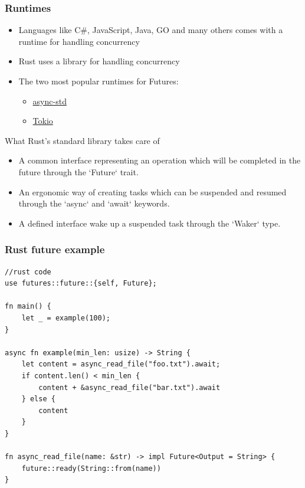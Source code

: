 \begin{frame}[fragile]
    \frametitle{Runtimes}
    \begin{itemize}
        \item Languages like C\#, JavaScript, Java, GO and many others comes with a runtime for handling concurrency
        \item Rust uses a library for handling concurrency

        \item The two most popular runtimes for Futures:
    	\begin{itemize}
    	    \item \href{https://github.com/async-rs/async-std}{async-std}
    	    \item \href{https://github.com/tokio-rs/tokio}{Tokio}
    	\end{itemize}
    \end{itemize}
% 
{\color{red}What Rust's standard library takes care of}
% 
    \begin{itemize}
        \item A {\color{red}common interface} representing an operation which will be completed in the future through the `Future` trait.
        \item An ergonomic way of {\color{red}creating tasks} which can be suspended and resumed through the `async` and `await` keywords.
        \item A defined interface wake up a suspended task through the `Waker` type.
    \end{itemize}
% 
\end{frame}
\begin{frame}[fragile]
    \frametitle{Rust future example}
% 
% 
\begin{block}{}
    \begin{verbatim}
//rust code
use futures::future::{self, Future};

fn main() {
    let _ = example(100);
}

async fn example(min_len: usize) -> String {
    let content = async_read_file("foo.txt").await;
    if content.len() < min_len {
        content + &async_read_file("bar.txt").await
    } else {
        content
    }
}

fn async_read_file(name: &str) -> impl Future<Output = String> {
    future::ready(String::from(name))
}
    \end{verbatim}
\end{block}
% 
\end{frame}
